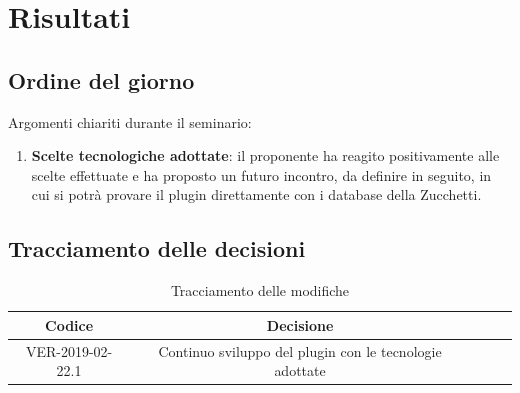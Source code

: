 \documentclass{article}
\begin{document}
\section{Risultati}
    \subsection{Ordine del giorno}
    Argomenti chiariti durante il seminario:
    \begin{enumerate}
        \item \textbf{Scelte tecnologiche adottate}: il proponente ha reagito positivamente alle scelte effettuate e ha proposto un futuro incontro, da definire in seguito, in cui si potrà provare il plugin direttamente con i database della Zucchetti.
    \end{enumerate}
    
    \subsection{Tracciamento delle decisioni}
    \begin{table}[!h] %
            \centering
            \renewcommand{\arraystretch}{2}
            \begin{tabular}{|c|c|p{6cm}|l|l|} %
                \rowcolor{orange!50} %
        		\hline
        		\textbf{Codice} & \textbf{Decisione}\\
                \hline
                VER-2019-02-22.1 & Continuo sviluppo del plugin con le tecnologie adottate\\
                \hline

        \end{tabular}
        \caption{Tracciamento delle modifiche} %
        \label{tab:Tracciamento delle modifiche}
        \end{table}
    
\end{document}

